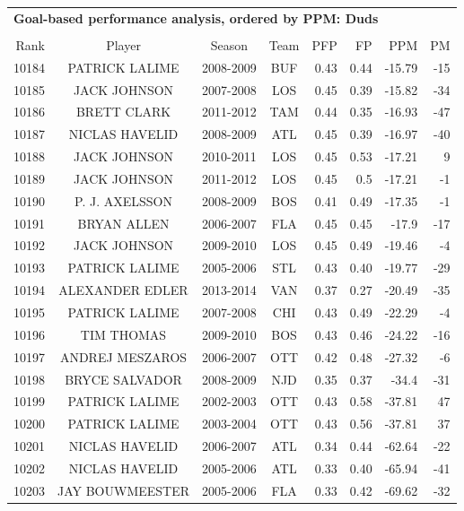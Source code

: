 \documentclass[11pt,xcolor=svgnames]{beamer}
\newcommand{\theme}{\color{DarkBlue}}
\begin{document}
\begin{frame}
\scriptsize
	\begin{tabular}{r c c c|r r r r }
		\multicolumn{8}{l}{\bf\theme Goal-based performance analysis, ordered by PPM: Duds} \\ \\
		Rank & Player & Season  & Team & PFP & FP & PPM & PM \\ \hline
		\rule{0pt}{4ex} 

		10184&PATRICK LALIME&2008-2009&BUF&0.43&0.44&-15.79&-15\\
		10185&JACK JOHNSON&2007-2008&LOS&0.45&0.39&-15.82&-34\\
		10186&BRETT CLARK&2011-2012&TAM&0.44&0.35&-16.93&-47\\
		10187&NICLAS HAVELID&2008-2009&ATL&0.45&0.39&-16.97&-40\\
		10188&JACK JOHNSON&2010-2011&LOS&0.45&0.53&-17.21&9\\
		10189&JACK JOHNSON&2011-2012&LOS&0.45&0.5&-17.21&-1\\
		10190&P. J. AXELSSON&2008-2009&BOS&0.41&0.49&-17.35&-1\\
		10191&BRYAN ALLEN&2006-2007&FLA&0.45&0.45&-17.9&-17\\
		10192&JACK JOHNSON&2009-2010&LOS&0.45&0.49&-19.46&-4\\
		10193&PATRICK LALIME&2005-2006&STL&0.43&0.40&-19.77&-29\\
		10194&ALEXANDER EDLER&2013-2014&VAN&0.37&0.27&-20.49&-35\\
		10195&PATRICK LALIME&2007-2008&CHI&0.43&0.49&-22.29&-4\\
		10196&TIM THOMAS&2009-2010&BOS&0.43&0.46&-24.22&-16\\
		10197&ANDREJ MESZAROS&2006-2007&OTT&0.42&0.48&-27.32&-6\\
		10198&BRYCE SALVADOR&2008-2009&NJD&0.35&0.37&-34.4&-31\\
		10199&PATRICK LALIME&2002-2003&OTT&0.43&0.58&-37.81&47\\
		10200&PATRICK LALIME&2003-2004&OTT&0.43&0.56&-37.81&37\\
		10201&NICLAS HAVELID&2006-2007&ATL&0.34&0.44&-62.64&-22\\
		10202&NICLAS HAVELID&2005-2006&ATL&0.33&0.40&-65.94&-41\\
		10203&JAY BOUWMEESTER&2005-2006&FLA&0.33&0.42&-69.62&-32\\
	\end{tabular}

\end{frame}
\end{document}
